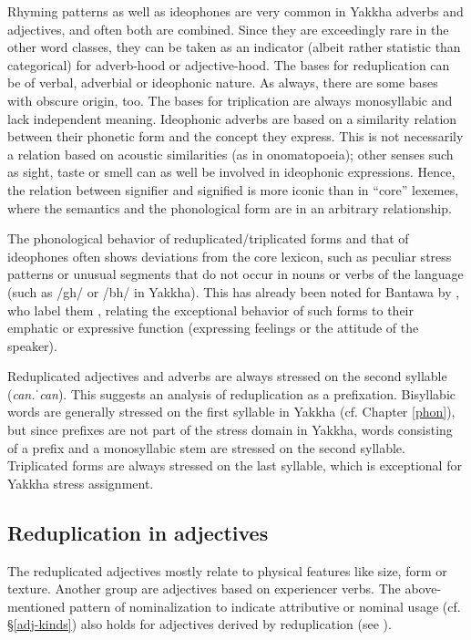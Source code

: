 Rhyming patterns as well as ideophones are very common in Yakkha adverbs and adjectives, and often both are combined. Since they are exceedingly rare in the other word classes, they can be taken as an indicator (albeit rather statistic than categorical) for adverb-hood or adjective-hood. The bases for reduplication can be of verbal, adverbial or ideophonic nature. As always, there are some  bases with obscure origin, too. The bases for triplication are always monosyllabic and lack independent meaning. Ideophonic adverbs are based on a similarity relation between their phonetic form and the concept they express. This is not necessarily a relation based on acoustic similarities (as in onomatopoeia); other senses such as sight, taste or smell can as well be involved in ideophonic expressions. Hence, the relation between signifier and signified is more iconic than in “core” lexemes, where the semantics and the phonological form are in an arbitrary relationship.

The phonological behavior of reduplicated/triplicated forms and that of ideophones often shows deviations from the core lexicon, such as peculiar stress patterns or unusual segments that do not occur in nouns or verbs of the language (such as /gh/ or /bh/ in Yakkha). This has already been noted for Bantawa by \citet{Raietal1997Triplicated}, who label them , relating the exceptional behavior of such forms to their emphatic or expressive function (expressing feelings or the attitude of the speaker). 

Reduplicated adjectives and adverbs are always stressed on the second syllable (\emph{can.ˈcan}). This suggests an analysis of reduplication as a prefixation. Bisyllabic words are generally stressed on the first syllable in Yakkha (cf. Chapter \ref{phon}), but since prefixes are not part of the stress domain in Yakkha, words consisting of a prefix and a monosyllabic stem are stressed on the second syllable. Triplicated forms are always stressed on the last syllable, which is exceptional for Yakkha stress assignment. 

\subsection{Reduplication in adjectives}

The reduplicated adjectives mostly relate to physical features like size, form or texture. Another group are adjectives  based on experiencer verbs. The above-mentioned pattern of nominalization to indicate attributive or nominal usage (cf. §\ref{adj-kinds}) also holds for adjectives derived by reduplication (see \Next). 


